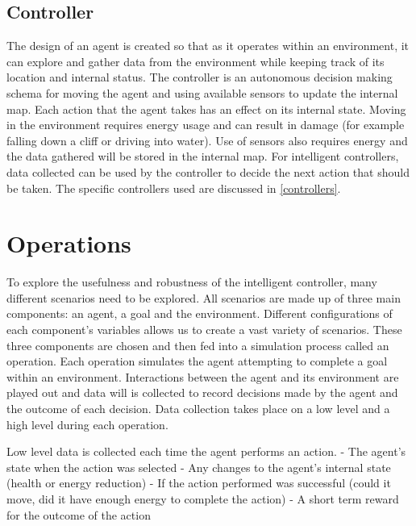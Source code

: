 \subsection{Controller}
The design of an agent is created so that as it operates within an environment, it can explore and gather data from the environment while keeping track of its location and internal status.
The controller is an autonomous decision making schema for moving the agent and using available sensors to update the internal map.
Each action that the agent takes has an effect on its internal state.
Moving in the environment requires energy usage and can result in damage (for example falling down a cliff or driving into water).
Use of sensors also requires energy and the data gathered will be stored in the internal map.
For intelligent controllers, data collected can be used by the controller to decide the next action that should be taken.
The specific controllers used are discussed in \ref{controllers}.




\section{Operations}
To explore the usefulness and robustness of the intelligent controller, many different scenarios need to be explored.
All scenarios are made up of three main components: an agent, a goal and the environment.
Different configurations of each component's variables allows us to create a vast variety of scenarios.
These three components are chosen and then fed into a simulation process called an operation. 
Each operation simulates the agent attempting to complete a goal within an environment.
Interactions between the agent and its environment are played out and data will is collected to record decisions made by the agent and the outcome of each decision.
Data collection takes place on a low level and a high level during each operation.

Low level data is collected each time the agent performs an action.
- The agent's state when the action was selected
- Any changes to the agent's internal state (health or energy reduction)
- If the action performed was successful (could it move, did it have enough energy to complete the action)
- A short term reward for the outcome of the action


